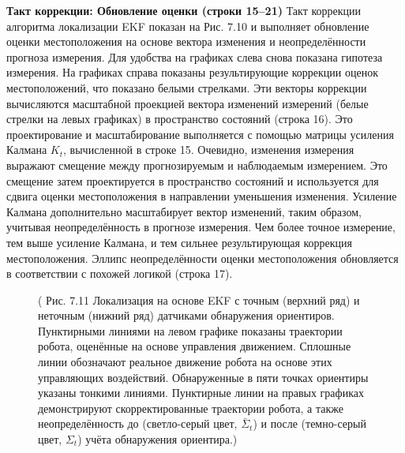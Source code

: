 \documentclass[10pt,a4paper]{article}
\begin{document}
\textbf{Такт коррекции: Обновление оценки (строки 15–21)} Такт коррекции алгоритма локализации EKF показан на Рис. 7.10 и выполняет обновление оценки местоположения на основе вектора изменения и неопределённости прогноза измерения. Для удобства на графиках слева снова показана гипотеза измерения. На графиках справа показаны результирующие коррекции оценок местоположений, что показано белыми стрелками. Эти векторы коррекции вычисляются масштабной проекцией вектора изменений измерений (белые стрелки на левых графиках) в пространство состояний (строка 16). Это проектирование и масштабирование выполняется с помощью матрицы усиления Калмана $K_t$, вычисленной в строке 15. Очевидно, изменения измерения выражают смещение между прогнозируемым и наблюдаемым измерением. Это смещение затем проектируется в пространство состояний и используется для сдвига оценки местоположения в направлении уменьшения изменения.  Усиление Калмана дополнительно масштабирует вектор изменений, таким образом, учитывая неопределённость в прогнозе измерения. Чем более точное измерение, тем выше усиление Калмана, и тем сильнее результирующая коррекция местоположения. Эллипс неопределённости оценки местоположения обновляется в соответствии с похожей логикой (строка 17).

\begin{figure}[H]
	\caption{ (  Рис. 7.11 Локализация на основе EKF с точным (верхний ряд) и неточным (нижний ряд) датчиками обнаружения ориентиров. Пунктирными линиями на левом графике показаны траектории робота, оценённые на основе управления движением. Сплошные линии обозначают реальное движение робота на основе этих управляющих воздействий. Обнаруженные в пяти точках ориентиры указаны тонкими линиями. Пунктирные линии на правых графиках демонстрируют скорректированные траектории робота, а также неопределённость до (светло-серый цвет, $\bar{\varSigma}_t$) и после (темно-серый цвет, $\varSigma_t$) учёта обнаружения ориентира.)}
	\label{fig:711orig}
\end{figure}
\end{document}
